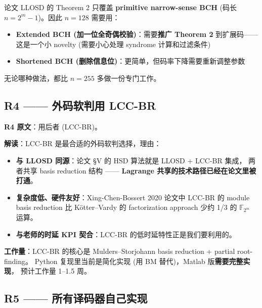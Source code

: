 \documentclass[11pt,a4paper]{article}
\begin{document}
\begin{riskbox}[title=\textbf{n=128 的技术风险 (需要老师定夺)}]
论文 LLOSD 的 Theorem 2 只覆盖 \textbf{primitive narrow-sense BCH}
(码长 $n = 2^m - 1$)。因此 $n=128$ 需要用：

\begin{itemize}[leftmargin=1em, itemsep=1pt, topsep=2pt]
\item \textbf{Extended BCH (加一位全奇偶校验)}：需要\textbf{推广 Theorem 2}
到扩展码——这是一个小 novelty (需要小心处理 syndrome 计算和过滤条件)
\item \textbf{Shortened BCH (删除信息位)}：更简单，但码率下降需要重新调整参数
\end{itemize}

无论哪种做法，都比 $n=255$ 多做一份专门工作。
\end{riskbox}

\subsection{R4 —— 外码软判用 LCC-BR}

\begin{quotebox}
\textbf{R4 原文}：用后者 (LCC-BR)。
\end{quotebox}

\textbf{解读}：LCC-BR 是最合适的外码软判选择，理由：

\begin{itemize}[leftmargin=1.5em, itemsep=1pt]
\item \textbf{与 LLOSD 同源}：论文 §V 的 HSD 算法就是 LLOSD + LCC-BR 集成，
两者共享 basis reduction 结构 —— \textbf{Lagrange 共享的技术路径已经在论文里被打通}。
\item \textbf{复杂度低、硬件友好}：Xing-Chen-Bossert 2020 论文中 LCC-BR 的 module basis
reduction 比 K\"otter–Vardy 的 factorization approach 少约 1/3 的 $\mathbb{F}_{2^m}$ 运算。
\item \textbf{与老师的时延 KPI 契合}：LCC-BR 的低时延特性正是我们要利用的。
\end{itemize}

\textbf{工作量}：LCC-BR 的核心是 Mulders--Storjohann basis reduction + partial root-finding。
Python 复现里当前是简化实现 (用 BM 替代)，Matlab 版\textbf{需要完整实现}，
预计工作量 1--1.5 周。

\subsection{R5 —— 所有译码器自己实现}
\end{document}
